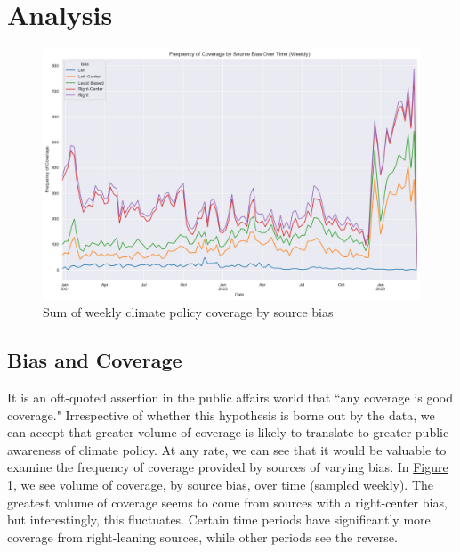 \documentclass[letterpaper,11pt]{article}
\begin{document}

\section{Analysis}

\begin{figure}[htbp]
    \centering
    \includegraphics[width=\textwidth]{figs/fig_5.png}
    \caption{Sum of weekly climate policy coverage by source bias}
    \label{fig:fig1}
\end{figure}

\subsection{Bias and Coverage}
It is an oft-quoted assertion in the public affairs world that ``any coverage is good coverage." Irrespective of whether this hypothesis is borne out by the data, we can accept that greater volume of coverage is likely to translate to greater public awareness of climate policy. At any rate, we can see that it would be valuable to examine the frequency of coverage provided by sources of varying bias. In \hyperref[fig:fig1]{Figure 1}, we see volume of coverage, by source bias, over time (sampled weekly). The greatest volume of coverage seems to come from sources with a right-center bias, but interestingly, this fluctuates. Certain time periods have significantly more coverage from right-leaning sources, while other periods see the reverse.
\end{document}
